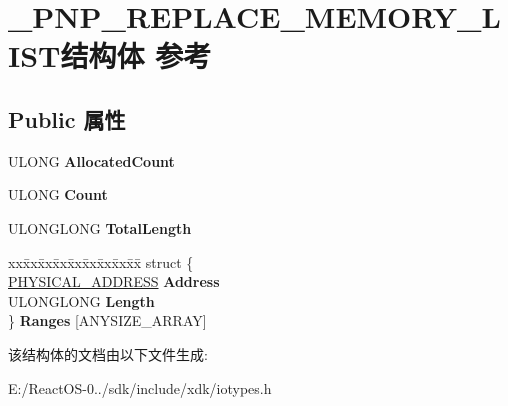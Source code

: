\hypertarget{struct___p_n_p___r_e_p_l_a_c_e___m_e_m_o_r_y___l_i_s_t}{}\section{\+\_\+\+P\+N\+P\+\_\+\+R\+E\+P\+L\+A\+C\+E\+\_\+\+M\+E\+M\+O\+R\+Y\+\_\+\+L\+I\+S\+T结构体 参考}
\label{struct___p_n_p___r_e_p_l_a_c_e___m_e_m_o_r_y___l_i_s_t}
\subsection*{Public 属性}
\begin{DoxyCompactItemize}
\item 
\mbox{\label{struct___p_n_p___r_e_p_l_a_c_e___m_e_m_o_r_y___l_i_s_t_a5bf9768e477d83d9a46de8cd5503589d}} 
U\+L\+O\+NG {\bfseries Allocated\+Count}
\item 
\mbox{\label{struct___p_n_p___r_e_p_l_a_c_e___m_e_m_o_r_y___l_i_s_t_aeaf0b2e06a000da60fc4ff4247a1801b}} 
U\+L\+O\+NG {\bfseries Count}
\item 
\mbox{\label{struct___p_n_p___r_e_p_l_a_c_e___m_e_m_o_r_y___l_i_s_t_a4031cf72914bf31e689aab2b595ba797}} 
U\+L\+O\+N\+G\+L\+O\+NG {\bfseries Total\+Length}
\item 
\mbox{\label{struct___p_n_p___r_e_p_l_a_c_e___m_e_m_o_r_y___l_i_s_t_ab29d71a49031f6f597f9717c509e2918}} 
\begin{tabbing}
xx\=xx\=xx\=xx\=xx\=xx\=xx\=xx\=xx\=\kill
struct \{\\
\>\hyperlink{union___l_a_r_g_e___i_n_t_e_g_e_r}{PHYSICAL\_ADDRESS} {\bfseries Address}\\
\>ULONGLONG {\bfseries Length}\\
\} {\bfseries Ranges} \mbox{[}ANYSIZE\_ARRAY\mbox{]}\\

\end{tabbing}\end{DoxyCompactItemize}


该结构体的文档由以下文件生成\+:\begin{DoxyCompactItemize}
\item 
E\+:/\+React\+O\+S-\/0../sdk/include/xdk/iotypes.\+h\end{DoxyCompactItemize}
